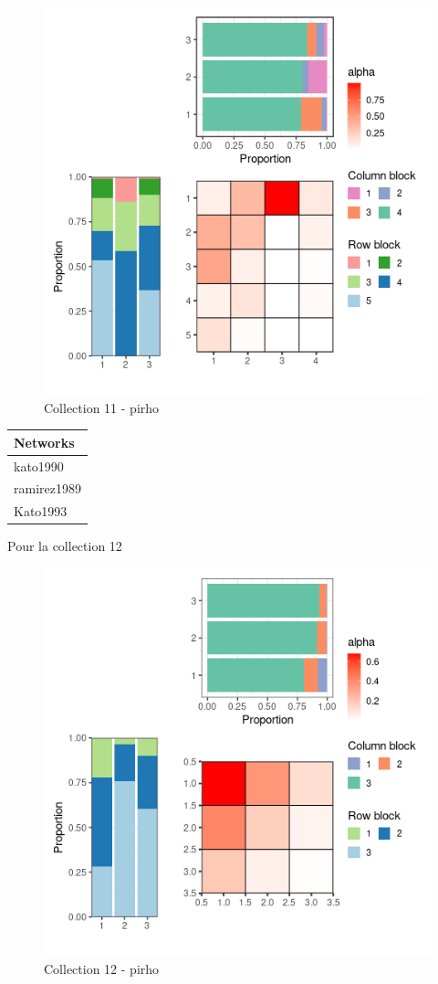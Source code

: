 \begin{figure}
\centering
\includegraphics{figure/pirho_meso_plot-11.png}
\caption{Collection 11 - pirho}
\end{figure}

\begin{longtable}[]{@{}l@{}}
\toprule
Networks\tabularnewline
\midrule
\endhead
kato1990\tabularnewline
ramirez1989\tabularnewline
Kato1993\tabularnewline
\bottomrule
\end{longtable}

Pour la collection 12

\begin{figure}
\centering
\includegraphics{figure/pirho_meso_plot-12.png}
\caption{Collection 12 - pirho}
\end{figure}

